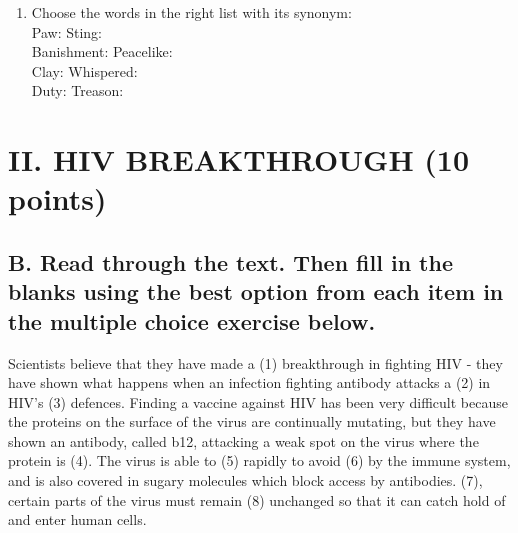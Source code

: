 \documentclass[11pt,a4paper]{article}
\begin{document}
\begin{enumerate}
    \item Choose the words in the right list with its synonym: \\
    Paw: \underline{\hspace{3cm}} Sting: \underline{\hspace{3cm}} \\
    Banishment: \underline{\hspace{3cm}} Peacelike: \underline{\hspace{3cm}} \\
    Clay: \underline{\hspace{3cm}} Whispered: \underline{\hspace{3cm}} \\
    Duty: \underline{\hspace{3cm}} Treason: \underline{\hspace{3cm}}
\end{enumerate}

\section{II. HIV BREAKTHROUGH (10 points)}

\subsection{B. Read through the text. Then fill in the blanks using the best option from each item in the multiple choice exercise below.}

Scientists believe that they have made a \underline{\hspace{2cm}} (1) breakthrough in fighting HIV - they have shown what happens when an infection fighting antibody attacks a \underline{\hspace{2cm}} (2) in HIV's \underline{\hspace{2cm}} (3) defences. Finding a vaccine against HIV has been very difficult because the proteins on the surface of the virus are continually mutating, but they have shown an antibody, called b12, attacking a weak spot on the virus where the protein is \underline{\hspace{2cm}} (4). The virus is able to \underline{\hspace{2cm}} (5) rapidly to avoid \underline{\hspace{2cm}} (6) by the immune system, and is also covered in sugary molecules which block access by antibodies. \underline{\hspace{2cm}} (7), certain parts of the virus must remain \underline{\hspace{2cm}} (8) unchanged so that it can catch hold of and enter human cells.
\end{document}
